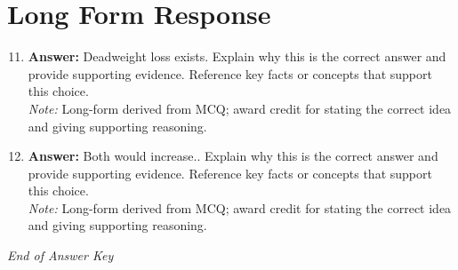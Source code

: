 \documentclass[12pt]{article}
\begin{document}
\section*{Long Form Response}
\begin{enumerate}[label=\arabic*.]
\setcounter{enumi}{10}
\item \textbf{Answer:} Deadweight loss exists. Explain why this is the correct answer and provide supporting evidence. Reference key facts or concepts that support this choice.
\\ \textit{Note:} Long-form derived from MCQ; award credit for stating the correct idea and giving supporting reasoning.
\item \textbf{Answer:} Both would increase.. Explain why this is the correct answer and provide supporting evidence. Reference key facts or concepts that support this choice.
\\ \textit{Note:} Long-form derived from MCQ; award credit for stating the correct idea and giving supporting reasoning.
\end{enumerate}

\vfill
\noindent\textit{End of Answer Key}
\end{document}
